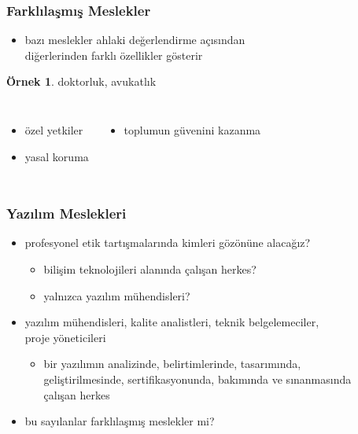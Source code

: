\documentclass[dvipsnames]{beamer}
\theoremstyle{definition}
\theoremstyle{example}
\newtheorem{ornek}[theorem]{Örnek}
\theoremstyle{plain}
\begin{document}
\begin{frame}
  \frametitle{Farklılaşmış Meslekler}

  \begin{itemize}
    \item bazı meslekler ahlaki değerlendirme açısından\\
      diğerlerinden farklı özellikler gösterir
  \end{itemize}

  \begin{ornek}
    doktorluk, avukatlık
  \end{ornek}

  \pause
  \begin{columns}
    \begin{itemize}
      \item özel yetkiler
      \item yasal koruma
    \end{itemize}

    \begin{itemize}
      \item toplumun güvenini kazanma
    \end{itemize}
  \end{columns}
\end{frame}

\begin{frame}
  \frametitle{Yazılım Meslekleri}

  \begin{itemize}
    \item profesyonel etik tartışmalarında kimleri gözönüne alacağız?
    \begin{itemize}
      \item bilişim teknolojileri alanında çalışan herkes?
      \item yalnızca yazılım mühendisleri?
    \end{itemize}

    \pause
    \medskip
    \item yazılım mühendisleri, kalite analistleri, teknik belgelemeciler,\\
      proje yöneticileri
    \begin{itemize}
      \item bir yazılımın analizinde, belirtimlerinde, tasarımında,\\
        geliştirilmesinde, sertifikasyonunda, bakımında ve sınanmasında\\
        çalışan herkes
    \end{itemize}
  \end{itemize}

  \pause
  \bigskip
  \begin{itemize}
    \item bu sayılanlar farklılaşmış meslekler mi?
  \end{itemize}
\end{frame}
\end{document}
